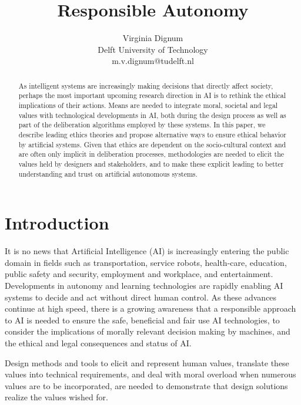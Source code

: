 \documentclass[twocolumn]{article}
\title{Responsible Autonomy}
\author{Virginia Dignum\\ Delft University of Technology \\ m.v.dignum@tudelft.nl}
\begin{document}
\maketitle

\begin{abstract}
As intelligent systems are increasingly making decisions that directly affect society, perhaps the most important upcoming research direction in AI is to rethink the ethical implications of their actions. Means are needed to integrate moral, societal and legal values with technological developments in AI, both during the design process as well as part of the deliberation algorithms employed by these systems. In this paper, we describe leading ethics theories and propose alternative ways to ensure ethical behavior by artificial systems. %
Given that ethics are dependent on the socio-cultural context and are often only implicit in deliberation processes, methodologies are needed to elicit the values held by designers and stakeholders, and to make these explicit leading to better understanding and trust on artificial autonomous systems.
\end{abstract}

\section{Introduction}\label{sec:intro}
It is no news that Artificial Intelligence (AI) is increasingly entering the public domain in fields such as  transportation, service robots, health-care, education, public safety and security, employment and workplace, and entertainment. Developments in autonomy and learning technologies are rapidly enabling AI systems to decide and act without direct human control. 
As these advances continue at high speed, there is a growing awareness that a responsible approach to AI is needed to ensure the safe, beneficial and fair use AI technologies, to consider the implications of morally relevant decision making by machines, and the ethical and legal consequences and status of AI. 

Design methods and tools to elicit and represent human values, translate these values into technical requirements, and deal with moral overload when numerous values are to be incorporated, are needed to demonstrate that design solutions realize the values wished for. 
\end{document}
